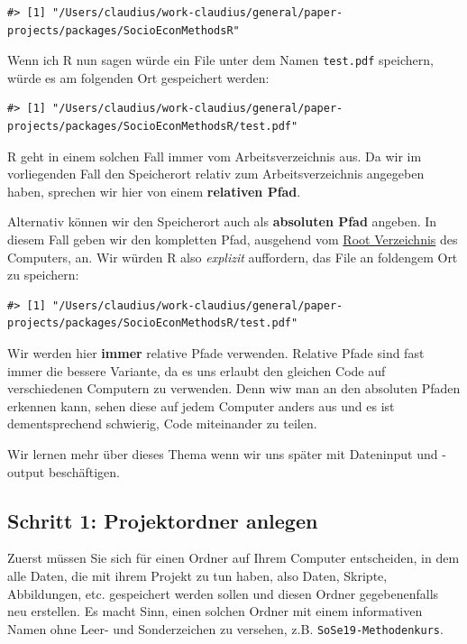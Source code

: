 \documentclass[]{book}
\begin{document}
\begin{verbatim}
#> [1] "/Users/claudius/work-claudius/general/paper-projects/packages/SocioEconMethodsR"
\end{verbatim}

Wenn ich R nun sagen würde ein File unter dem Namen \texttt{test.pdf}
speichern, würde es am folgenden Ort gespeichert werden:

\begin{verbatim}
#> [1] "/Users/claudius/work-claudius/general/paper-projects/packages/SocioEconMethodsR/test.pdf"
\end{verbatim}

R geht in einem solchen Fall immer vom Arbeitsverzeichnis aus. Da wir im
vorliegenden Fall den Speicherort relativ zum Arbeitsverzeichnis
angegeben haben, sprechen wir hier von einem \textbf{relativen Pfad}.

Alternativ können wir den Speicherort auch als \textbf{absoluten Pfad}
angeben. In diesem Fall geben wir den kompletten Pfad, ausgehend vom
\href{https://de.wikipedia.org/wiki/Stammverzeichnis}{Root Verzeichnis}
des Computers, an. Wir würden R also \emph{explizit} auffordern, das
File an foldengem Ort zu speichern:

\begin{verbatim}
#> [1] "/Users/claudius/work-claudius/general/paper-projects/packages/SocioEconMethodsR/test.pdf"
\end{verbatim}

Wir werden hier \textbf{immer} relative Pfade verwenden. Relative Pfade
sind fast immer die bessere Variante, da es uns erlaubt den gleichen
Code auf verschiedenen Computern zu verwenden. Denn wiw man an den
absoluten Pfaden erkennen kann, sehen diese auf jedem Computer anders
aus und es ist dementsprechend schwierig, Code miteinander zu teilen.

Wir lernen mehr über dieses Thema wenn wir uns später mit Dateninput und
-output beschäftigen.

\subsection{Schritt 1: Projektordner
anlegen}\label{schritt-1-projektordner-anlegen}

Zuerst müssen Sie sich für einen Ordner auf Ihrem Computer entscheiden,
in dem alle Daten, die mit ihrem Projekt zu tun haben, also Daten,
Skripte, Abbildungen, etc. gespeichert werden sollen und diesen Ordner
gegebenenfalls neu erstellen. Es macht Sinn, einen solchen Ordner mit
einem informativen Namen ohne Leer- und Sonderzeichen zu versehen, z.B.
\texttt{SoSe19-Methodenkurs}.
\end{document}
